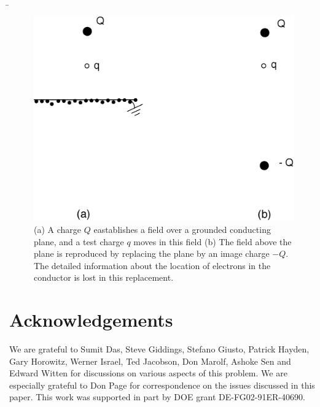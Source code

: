 \documentclass[12pt]{article}
\begin{document}
\b

\begin{figure}[htbp]
\begin{center}
\includegraphics[scale=.35]{fn10.eps}
\caption{{(a) A charge $Q$ eastablishes a field over a grounded conducting plane, and a test charge $q$ moves in this field (b) The field above the plane is reproduced by replacing the plane by an image charge $-Q$. The detailed information about the location of electrons in the conductor is lost in this replacement.}}
\label{fn10}
\end{center}
\end{figure}




\section*{Acknowledgements}

We are grateful to Sumit Das, Steve Giddings, Stefano Giusto, Patrick Hayden, Gary Horowitz, Werner Israel, Ted Jacobson, Don Marolf,   Ashoke Sen and Edward Witten for discussions on various aspects of this problem.  We are especially grateful to Don Page for  correspondence on the issues discussed in this paper. This  work was supported in part by DOE grant DE-FG02-91ER-40690.
\end{document}
